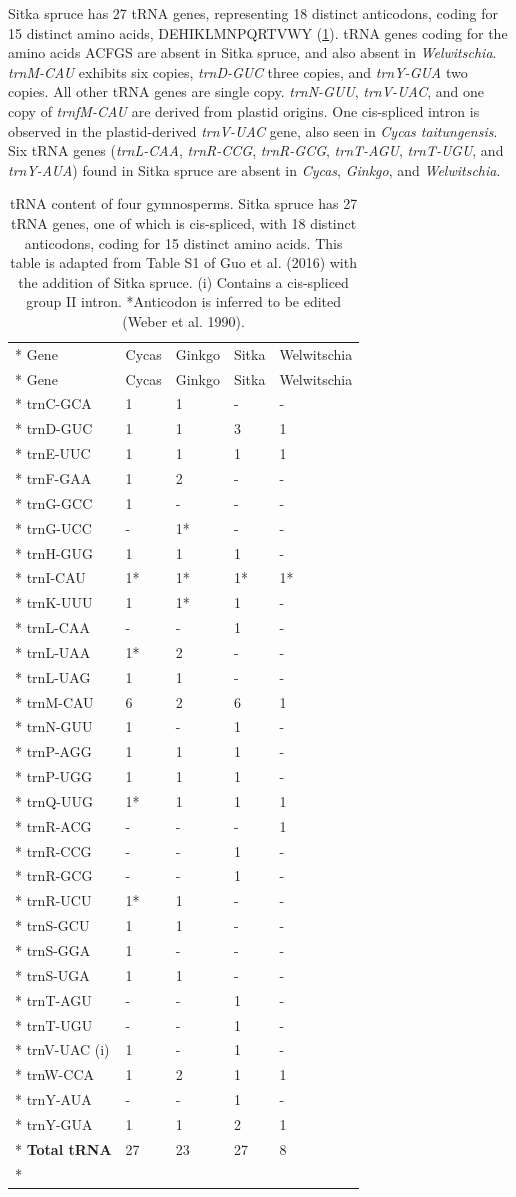 \documentclass[
  12pt,
  oneside,
  openany]{book}
\begin{document}
Sitka spruce has 27 tRNA genes, representing 18 distinct anticodons, coding for 15 distinct amino acids, DEHIKLMNPQRTVWY (\cref{tbl:trna}). tRNA genes coding for the amino acids ACFGS are absent in Sitka spruce, and also absent in \emph{Welwitschia}. \emph{trnM-CAU} exhibits six copies, \emph{trnD-GUC} three copies, and \emph{trnY-GUA} two copies. All other tRNA genes are single copy. \emph{trnN-GUU}, \emph{trnV-UAC}, and one copy of \emph{trnfM-CAU} are derived from plastid origins. One cis-spliced intron is observed in the plastid-derived \emph{trnV-UAC} gene, also seen in \emph{Cycas taitungensis}. Six tRNA genes (\emph{trnL-CAA}, \emph{trnR-CCG}, \emph{trnR-GCG}, \emph{trnT-AGU}, \emph{trnT-UGU}, and \emph{trnY-AUA}) found in Sitka spruce are absent in \emph{Cycas}, \emph{Ginkgo}, and \emph{Welwitschia}.

\hypertarget{tbl:trna}{}
\begin{singlespace}
\small
\begin{longtable}[]{@{}lllll@{}}
\caption[tRNA content of four gymnosperms.]{\label{tbl:trna}tRNA content of four gymnosperms. Sitka spruce has 27 tRNA genes, one of which is cis-spliced, with 18 distinct anticodons, coding for 15 distinct amino acids. This table is adapted from Table S1 of Guo et al. (2016) with the addition of Sitka spruce. (i) Contains a cis-spliced group II intron. *Anticodon is inferred to be edited (Weber et al. 1990).}\tabularnewline*
\toprule
Gene & Cycas & Ginkgo & Sitka & Welwitschia\tabularnewline*
\midrule
\endfirsthead
\toprule
Gene & Cycas & Ginkgo & Sitka & Welwitschia\tabularnewline*
\midrule
\endhead
trnC-GCA & 1 & 1 & - & -\tabularnewline*
trnD-GUC & 1 & 1 & 3 & 1\tabularnewline*
trnE-UUC & 1 & 1 & 1 & 1\tabularnewline*
trnF-GAA & 1 & 2 & - & -\tabularnewline*
trnG-GCC & 1 & - & - & -\tabularnewline*
trnG-UCC & - & 1* & - & -\tabularnewline*
trnH-GUG & 1 & 1 & 1 & -\tabularnewline*
trnI-CAU & 1* & 1* & 1* & 1*\tabularnewline*
trnK-UUU & 1 & 1* & 1 & -\tabularnewline*
trnL-CAA & - & - & 1 & -\tabularnewline*
trnL-UAA & 1* & 2 & - & -\tabularnewline*
trnL-UAG & 1 & 1 & - & -\tabularnewline*
trnM-CAU & 6 & 2 & 6 & 1\tabularnewline*
trnN-GUU & 1 & - & 1 & -\tabularnewline*
trnP-AGG & 1 & 1 & 1 & -\tabularnewline*
trnP-UGG & 1 & 1 & 1 & -\tabularnewline*
trnQ-UUG & 1* & 1 & 1 & 1\tabularnewline*
trnR-ACG & - & - & - & 1\tabularnewline*
trnR-CCG & - & - & 1 & -\tabularnewline*
trnR-GCG & - & - & 1 & -\tabularnewline*
trnR-UCU & 1* & 1 & - & -\tabularnewline*
trnS-GCU & 1 & 1 & - & -\tabularnewline*
trnS-GGA & 1 & - & - & -\tabularnewline*
trnS-UGA & 1 & 1 & - & -\tabularnewline*
trnT-AGU & - & - & 1 & -\tabularnewline*
trnT-UGU & - & - & 1 & -\tabularnewline*
trnV-UAC (i) & 1 & - & 1 & -\tabularnewline*
trnW-CCA & 1 & 2 & 1 & 1\tabularnewline*
trnY-AUA & - & - & 1 & -\tabularnewline*
trnY-GUA & 1 & 1 & 2 & 1\tabularnewline*
\textbf{Total tRNA} & 27 & 23 & 27 & 8\tabularnewline*
\bottomrule
\end{longtable}
\end{singlespace}
\end{document}
